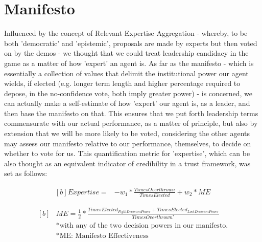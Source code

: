 

\section{Manifesto}

Influenced by the concept of Relevant Expertise Aggregation - whereby, to be both 'democratic' and 'epistemic', proposals are made by experts but then voted on by the demos - we thought that we could treat leadership candidacy in the game as a matter of how 'expert' an agent is. As far as the manifesto - which is essentially a collection of values that delimit the institutional power our agent wields, if elected (e.g. longer term length and higher percentage required to depose, in the no-confidence vote, both imply greater power) - is concerned, we can actually make a self-estimate of how 'expert' our agent is, as a leader, and then base the manifesto on that. This ensures that we put forth leadership terms commensurate with our actual performance, as a matter of principle, but also by extension that we will be more likely to be voted, considering the other agents may assess our manifesto relative to our performance, themselves, to decide on whether to vote for us. This quantification metric for 'expertise', which can be also thought as an equivalent indicator of credibility in a trust framework, was set as follows:

\begin{equation}
\begin{aligned}[b]
Expertise =& - w_1 * \frac{TimesOverthrown}{TimesElected} + w_2 * ME
\end{aligned}
\end{equation}

\begin{equation}
\begin{aligned}[b]
&ME = \frac{1}{2} * \frac{TimesElected_{FightDecisionPower} + TimesElected_{LootDecisionPower}}{TimesOverthrown^*}\\ &*\text{with any of the two decision powers in our manifesto.}\\
&*\text{ME: Manifesto Effectiveness}
\end{aligned}
\end{equation}

